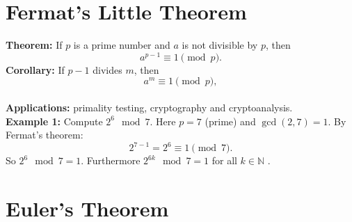 \section{Fermat's Little Theorem}

\textbf{Theorem:} If $p$ is a prime number and $a$ is not divisible by $p$, then
\[
a^{p-1} \equiv 1 \pmod{p}.
\]  
\vspace{1em}
\textbf{Corollary:} If $p-1$ divides $m$, then
\[
a^{m} \equiv 1 \pmod{p},
\]
\vspace{1em}
\\ \textbf{Applications:} primality testing, cryptography and cryptoanalysis.
\vspace{1em}
\\ \textbf{Example 1:} Compute $2^6 \mod 7$.  
Here $p = 7$ (prime) and $\gcd(2,7) = 1$. By Fermat's theorem:  
\[
2^{7-1} = 2^6 \equiv 1 \pmod{7}.
\]  
So $2^6 \mod 7 = 1$. Furthermore  $2^{6k} \mod 7 = 1$ for all $k \in \mathbb{N}$ .


\section{Euler's Theorem}

